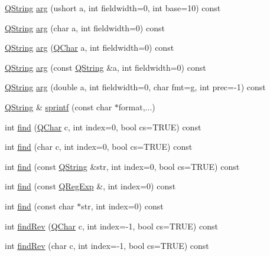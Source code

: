 \begin{DoxyCompactItemize}
\item 
\mbox{\hyperlink{class_q_string}{Q\+String}} \mbox{\hyperlink{class_q_string_aac4ae5c7abbd2646418249eaea3dc53b}{arg}} (ushort a, int fieldwidth=0, int base=10) const
\item 
\mbox{\hyperlink{class_q_string}{Q\+String}} \mbox{\hyperlink{class_q_string_ad7e8aa4fbe9f9c654bce5c370779b533}{arg}} (char a, int fieldwidth=0) const
\item 
\mbox{\hyperlink{class_q_string}{Q\+String}} \mbox{\hyperlink{class_q_string_a740e64a8e6502d50572c63b789ee73e7}{arg}} (\mbox{\hyperlink{class_q_char}{Q\+Char}} a, int fieldwidth=0) const
\item 
\mbox{\hyperlink{class_q_string}{Q\+String}} \mbox{\hyperlink{class_q_string_ac7bcea77370989a0da1a1952d8d763ec}{arg}} (const \mbox{\hyperlink{class_q_string}{Q\+String}} \&a, int fieldwidth=0) const
\item 
\mbox{\hyperlink{class_q_string}{Q\+String}} \mbox{\hyperlink{class_q_string_a6b112797e9accc6a76ec0f8eee68f98f}{arg}} (double a, int fieldwidth=0, char fmt=\textquotesingle{}g\textquotesingle{}, int prec=-\/1) const
\item 
\mbox{\hyperlink{class_q_string}{Q\+String}} \& \mbox{\hyperlink{class_q_string_a0b6622a8335cdd080e8b1685b7e0fde0}{sprintf}} (const char $\ast$format,...)
\item 
int \mbox{\hyperlink{class_q_string_a675617012888ffd3acc8aef4aed05690}{find}} (\mbox{\hyperlink{class_q_char}{Q\+Char}} c, int index=0, bool cs=T\+R\+UE) const
\item 
int \mbox{\hyperlink{class_q_string_a5c6efe54d7b27611879cfbac15ee4736}{find}} (char c, int index=0, bool cs=T\+R\+UE) const
\item 
int \mbox{\hyperlink{class_q_string_a669b2ce308f70c955801fa7b44329aeb}{find}} (const \mbox{\hyperlink{class_q_string}{Q\+String}} \&str, int index=0, bool cs=T\+R\+UE) const
\item 
int \mbox{\hyperlink{class_q_string_a8d0cb0b0f4448e196443561020e1438c}{find}} (const \mbox{\hyperlink{class_q_reg_exp}{Q\+Reg\+Exp}} \&, int index=0) const
\item 
int \mbox{\hyperlink{class_q_string_a78f93a65d91bb0fd659ff9af5b82f956}{find}} (const char $\ast$str, int index=0) const
\item 
int \mbox{\hyperlink{class_q_string_a97b5c9712f3f145d52f91d816763ceea}{find\+Rev}} (\mbox{\hyperlink{class_q_char}{Q\+Char}} c, int index=-\/1, bool cs=T\+R\+UE) const
\item 
int \mbox{\hyperlink{class_q_string_aeb1cbae47f31c7f116751f45bf01d60a}{find\+Rev}} (char c, int index=-\/1, bool cs=T\+R\+UE) const

\end{DoxyCompactItemize}
